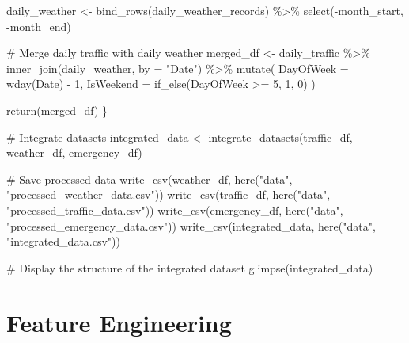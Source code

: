 \documentclass[
  letterpaper,
  DIV=11,
  numbers=noendperiod]{scrreprt}
\newenvironment{Shaded}{\begin{snugshade}}{\end{snugshade}}
\newcommand{\AttributeTok}[1]{\textcolor[rgb]{0.40,0.45,0.13}{#1}}
\newcommand{\CommentTok}[1]{\textcolor[rgb]{0.37,0.37,0.37}{#1}}
\newcommand{\DecValTok}[1]{\textcolor[rgb]{0.68,0.00,0.00}{#1}}
\newcommand{\FunctionTok}[1]{\textcolor[rgb]{0.28,0.35,0.67}{#1}}
\newcommand{\NormalTok}[1]{\textcolor[rgb]{0.00,0.23,0.31}{#1}}
\newcommand{\OtherTok}[1]{\textcolor[rgb]{0.00,0.23,0.31}{#1}}
\newcommand{\SpecialCharTok}[1]{\textcolor[rgb]{0.37,0.37,0.37}{#1}}
\newcommand{\StringTok}[1]{\textcolor[rgb]{0.13,0.47,0.30}{#1}}
\begin{document}
\begin{Shaded}
\begin{Highlighting}[]
\NormalTok{  daily\_weather }\OtherTok{\textless{}{-}} \FunctionTok{bind\_rows}\NormalTok{(daily\_weather\_records) }\SpecialCharTok{\%\textgreater{}\%}
    \FunctionTok{select}\NormalTok{(}\SpecialCharTok{{-}}\NormalTok{month\_start, }\SpecialCharTok{{-}}\NormalTok{month\_end)}
  
  \CommentTok{\# Merge daily traffic with daily weather}
\NormalTok{  merged\_df }\OtherTok{\textless{}{-}}\NormalTok{ daily\_traffic }\SpecialCharTok{\%\textgreater{}\%}
    \FunctionTok{inner\_join}\NormalTok{(daily\_weather, }\AttributeTok{by =} \StringTok{"Date"}\NormalTok{) }\SpecialCharTok{\%\textgreater{}\%}
    \FunctionTok{mutate}\NormalTok{(}
      \AttributeTok{DayOfWeek =} \FunctionTok{wday}\NormalTok{(Date) }\SpecialCharTok{{-}} \DecValTok{1}\NormalTok{,}
      \AttributeTok{IsWeekend =} \FunctionTok{if\_else}\NormalTok{(DayOfWeek }\SpecialCharTok{\textgreater{}=} \DecValTok{5}\NormalTok{, }\DecValTok{1}\NormalTok{, }\DecValTok{0}\NormalTok{)}
\NormalTok{    )}
  
  \FunctionTok{return}\NormalTok{(merged\_df)}
\NormalTok{\}}

\CommentTok{\# Integrate datasets}
\NormalTok{integrated\_data }\OtherTok{\textless{}{-}} \FunctionTok{integrate\_datasets}\NormalTok{(traffic\_df, weather\_df, emergency\_df)}

\CommentTok{\# Save processed data}
\FunctionTok{write\_csv}\NormalTok{(weather\_df, }\FunctionTok{here}\NormalTok{(}\StringTok{"data"}\NormalTok{, }\StringTok{"processed\_weather\_data.csv"}\NormalTok{))}
\FunctionTok{write\_csv}\NormalTok{(traffic\_df, }\FunctionTok{here}\NormalTok{(}\StringTok{"data"}\NormalTok{, }\StringTok{"processed\_traffic\_data.csv"}\NormalTok{))}
\FunctionTok{write\_csv}\NormalTok{(emergency\_df, }\FunctionTok{here}\NormalTok{(}\StringTok{"data"}\NormalTok{, }\StringTok{"processed\_emergency\_data.csv"}\NormalTok{))}
\FunctionTok{write\_csv}\NormalTok{(integrated\_data, }\FunctionTok{here}\NormalTok{(}\StringTok{"data"}\NormalTok{, }\StringTok{"integrated\_data.csv"}\NormalTok{))}

\CommentTok{\# Display the structure of the integrated dataset}
\FunctionTok{glimpse}\NormalTok{(integrated\_data)}
\end{Highlighting}
\end{Shaded}

\section{Feature Engineering}\label{feature-engineering}
\end{document}

